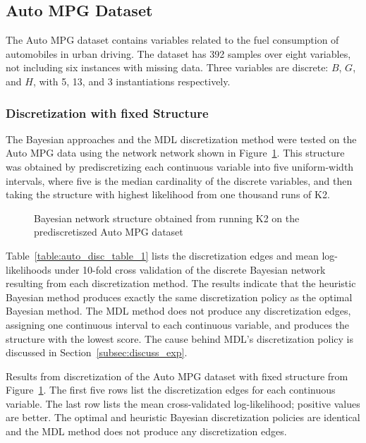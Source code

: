 \subsection{Auto MPG Dataset}
\label{subsec:auto}

The Auto MPG dataset contains variables related to the fuel consumption of automobiles in urban driving.
The dataset has \num{392} samples over eight variables, not including six instances with missing data.
Three variables are discrete: $B$, $G$, and $H$, with \num{5}, \num{13}, and \num{3} instantiations respectively.

\subsubsection{Discretization with fixed Structure}
\label{subsubsec:auto_exp1}

The Bayesian approaches and the MDL discretization method were tested on the Auto MPG data using the network network shown in Figure~\ref{fig:auto_graph_1}.
This structure was obtained by prediscretizing each continuous variable into five uniform-width intervals, where five is the median cardinality of the discrete variables, and then taking the structure with highest likelihood from one thousand runs of K2.

\begin{figure}[ht]
  \centering
   
   \caption{Bayesian network structure obtained from running K2 on the prediscretiszed Auto MPG dataset}
  \label{fig:auto_graph_1}
\end{figure}

Table~\ref{table:auto_disc_table_1} lists the discretization edges and mean log-likelihoods under 10-fold cross validation of the discrete Bayesian network resulting from each discretization method.
The results indicate that the heuristic Bayesian method produces exactly the same discretization policy as the optimal Bayesian method.
The MDL method does not produce any discretization edges, assigning one continuous interval to each continuous variable, and produces the structure with the lowest score.
The cause behind MDL's discretization policy is discussed in Section~\ref{subsec:discuss_exp}.

\begin{table}[h]
  \centering
  \caption{
    Results from discretization of the Auto MPG dataset with fixed structure from Figure~\ref{fig:auto_graph_1}.
    The first five rows list the discretization edges for each continuous variable.
    The last row lists the mean cross-validated log-likelihood; positive values are better.
    The optimal and heuristic Bayesian discretization policies are identical and the MDL method does not produce any discretization edges.
  }
  
  \label{table:auto_disc_table_1}
\end{table}


